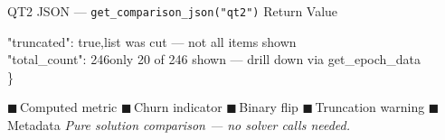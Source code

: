 \documentclass[aspectratio=169,10pt]{beamer}
\begin{document}
\begin{frame}[t]{QT2 JSON — \texttt{get\_comparison\_json("qt2")} Return Value}
\begin{block}{}
{    \quad "truncated": true,\hfill\textcolor{ared}{\tiny list was cut — not all items shown}\\
    \quad "total\_count": 246\hfill\textcolor{ared}{\tiny only 20 of 246 shown — drill down via get\_epoch\_data}\\
    \}
  }
\end{block}
\vspace{1pt}
\centering\scriptsize
\textcolor{pblue}{$\blacksquare$}\,Computed metric\quad
\textcolor{aorng}{$\blacksquare$}\,Churn indicator\quad
\textcolor{purp}{$\blacksquare$}\,Binary flip\quad
\textcolor{ared}{$\blacksquare$}\,Truncation warning\quad
\textcolor{mgray}{$\blacksquare$}\,Metadata\qquad
\textcolor{mgray}{\textit{Pure solution comparison — no solver calls needed.}}
\end{frame}
\end{document}
